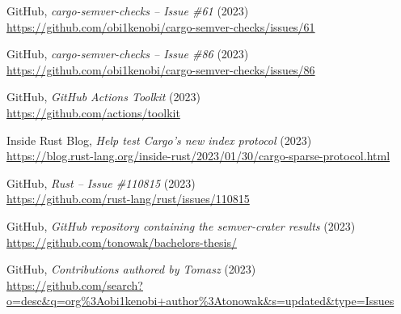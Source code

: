 \documentclass[licencjacka,en]{pracamgr}
\begin{document}
\begin{thebibliography}{99}

 GitHub,
	\textit{cargo-semver-checks -- Issue \#61} (2023) \\
	\url{https://github.com/obi1kenobi/cargo-semver-checks/issues/61}

 GitHub,
	\textit{cargo-semver-checks -- Issue \#86} (2023) \\
	\url{https://github.com/obi1kenobi/cargo-semver-checks/issues/86}










 GitHub,
	\textit{GitHub Actions Toolkit} (2023) \\
	\url{https://github.com/actions/toolkit}

 Inside Rust Blog,
\textit{Help test Cargo's new index protocol} (2023) \\
	\url{https://blog.rust-lang.org/inside-rust/2023/01/30/cargo-sparse-protocol.html}



 GitHub,
	\textit{Rust -- Issue \#110815} (2023) \\
	\url{https://github.com/rust-lang/rust/issues/110815}



 GitHub,
	\textit{GitHub repository containing the semver-crater results} (2023) \\
	\url{https://github.com/tonowak/bachelors-thesis/}



 GitHub,
	\textit{Contributions authored by Tomasz} (2023) \\
	\url{https://github.com/search?o=desc&q=org%3Aobi1kenobi+author%3Atonowak&s=updated&type=Issues}


\end{thebibliography}
\end{document}
